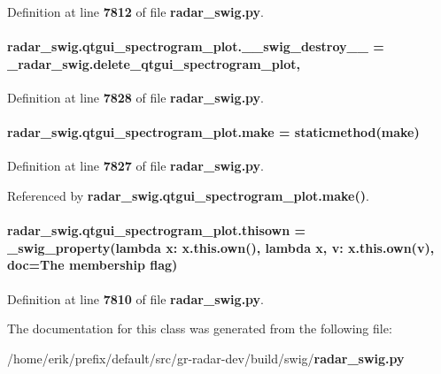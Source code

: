 Definition at line {\bf 7812} of file {\bf radar\+\_\+swig.\+py}.

\paragraph[{\+\_\+\+\_\+swig\+\_\+destroy\+\_\+\+\_\+}]{\setlength{\rightskip}{0pt plus 5cm}radar\+\_\+swig.\+qtgui\+\_\+spectrogram\+\_\+plot.\+\_\+\+\_\+swig\+\_\+destroy\+\_\+\+\_\+ = \+\_\+radar\+\_\+swig.\+delete\+\_\+qtgui\+\_\+spectrogram\+\_\+plot\hspace{0.3cm}{\ttfamily [static]}, {\ttfamily [private]}}\label{classradar__swig_1_1qtgui__spectrogram__plot_a48d90da2b2bb05b91309eaad4cab5822}


Definition at line {\bf 7828} of file {\bf radar\+\_\+swig.\+py}.

\paragraph[{make}]{\setlength{\rightskip}{0pt plus 5cm}radar\+\_\+swig.\+qtgui\+\_\+spectrogram\+\_\+plot.\+make = staticmethod(make)\hspace{0.3cm}{\ttfamily [static]}}\label{classradar__swig_1_1qtgui__spectrogram__plot_a0bf0334dd005d64aebcb27cf15bc8c5c}


Definition at line {\bf 7827} of file {\bf radar\+\_\+swig.\+py}.



Referenced by {\bf radar\+\_\+swig.\+qtgui\+\_\+spectrogram\+\_\+plot.\+make()}.

\paragraph[{thisown}]{\setlength{\rightskip}{0pt plus 5cm}radar\+\_\+swig.\+qtgui\+\_\+spectrogram\+\_\+plot.\+thisown = {\bf \+\_\+swig\+\_\+property}(lambda x\+: x.\+this.\+own(), lambda {\bf x}, v\+: x.\+this.\+own(v), doc=\textquotesingle{}The membership flag\textquotesingle{})\hspace{0.3cm}{\ttfamily [static]}}\label{classradar__swig_1_1qtgui__spectrogram__plot_ac9c47591e271cc80be2b540aba7c5d31}


Definition at line {\bf 7810} of file {\bf radar\+\_\+swig.\+py}.



The documentation for this class was generated from the following file\+:\begin{DoxyCompactItemize}
\item 
/home/erik/prefix/default/src/gr-\/radar-\/dev/build/swig/{\bf radar\+\_\+swig.\+py}\end{DoxyCompactItemize}
